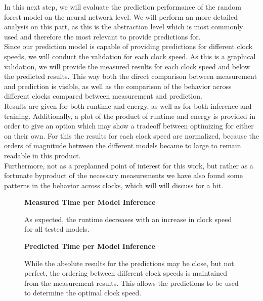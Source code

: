 In this next step, we will evaluate the prediction performance of the random forest model on the neural network level. We will perform an more detailed analysis on this part, as this is the abstraction level which is most commonly used and therefore the most relevant to provide predictions for. \\
Since our prediction model is capable of providing predictions for different clock speeds, we will conduct the validation for each clock speed. As this is a graphical validation, we will provide the measured results for each clock speed and below the predicted results. This way both the direct comparison between measurement and prediction is visible, as well as the comparison of the behavior across different clocks compared between measurement and prediction. \\
Results are given for both runtime and energy, as well as for both inference and training. Additionally, a plot of the product of runtime and energy is provided in order to give an option which may show a tradeoff between optimizing for either on their own. For this the results for each clock speed are normalized, because the orders of magnitude between the different models became to large to remain readable in this product. \\
Furthermore, not as a preplanned point of interest for this work, but rather as a fortunate byproduct of the necessary measurements we have also found some patterns in the behavior across clocks, which will will discuss for a bit.



\begin{figure}[htbp]
    \centering
    \parbox{1.1\textwidth}{\centering\textbf{Measured Time per Model Inference}}
    \caption{As expected, the runtime decreases with an increase in clock speed for all tested models.}
    \label{fig:grpfmtimeinf}
    \vspace{0.2cm}
    \parbox{1.1\textwidth}{\centering\textbf{Predicted Time per Model Inference}}
    \caption{While the absolute results for the predictions may be close, but not perfect, the ordering between different clock speeds is maintained from the measurement results. This allows the predictions to be used to determine the optimal clock speed.}
    \label{fig:gprpredtimeinf}
\end{figure}



